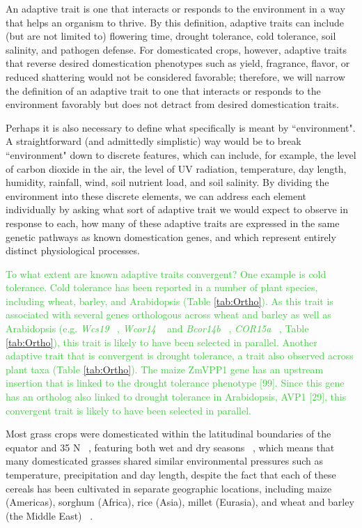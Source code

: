 \documentclass[12pt]{article}
\newcommand{\mw}[1]{\textcolor{LimeGreen}{\normalsize #1}}
\begin{document}
An adaptive trait is one that interacts or responds to the environment in a way that helps an organism to thrive. 
By this definition, adaptive traits can include (but are not limited to) flowering time, drought tolerance, cold tolerance, soil salinity, and pathogen defense. 
For domesticated crops, however, adaptive traits that reverse desired domestication phenotypes such as yield, fragrance, flavor, or reduced shattering would not be considered favorable; therefore, we will narrow the definition of an adaptive trait to one that interacts or responds to the environment favorably but does not detract from desired domestication traits. 

Perhaps it is also necessary to define what specifically is meant by ``environment".
A straightforward (and admittedly simplistic) way would be to break ``environment" down to discrete features, which can include, for example, the level of carbon dioxide in the air, the level of UV radiation, temperature, day length, humidity, rainfall, wind, soil nutrient load, and soil salinity. 
By dividing the environment into these discrete elements, we can address each element individually by asking what sort of adaptive trait we would expect to observe in response to each, how many of these adaptive traits are expressed in the same genetic pathways as known domestication genes, and which represent entirely distinct physiological processes.

\mw{To what extent are known adaptive traits convergent? One example is cold tolerance. Cold tolerance has been reported in a number of plant species, including wheat, barley, and Arabidopsis (Table \ref{tab:Ortho}). As this trait is associated with several genes orthologous across wheat and barley as well as Arabidopsis (e.g.  \textit{Wcs19} ~\citep{pmid8219063}, \textit{Wcor14} ~\citep{pmid10846621} and \textit{Bcor14b} ~\citep{pmid9952464}, \textit{COR15a}  ~\citep{pmid9826741, Takumi2003}, Table \ref{tab:Ortho}), this trait is likely to have been selected in parallel.  Another adaptive trait that is convergent is drought tolerance, a trait also observed across plant taxa (Table \ref{tab:Ortho}). The maize ZmVPP1 gene has an upstream insertion that is linked to the drought tolerance phenotype [99]. Since this gene has an ortholog also linked to drought tolerance in Arabidopsis, AVP1 [29], this convergent trait is likely to have been selected in parallel. }

Most grass crops were domesticated within the latitudinal boundaries of the equator and 35 N ~\citep{Jain1993, Gepts2010}, featuring both wet and dry seasons ~\citep{Jain1993}, which means that many domesticated grasses shared similar environmental pressures such as temperature, precipitation and day length, despite the fact that each of these cereals has been cultivated in separate geographic locations, including maize (Americas), sorghum (Africa), rice (Asia), millet (Eurasia), and wheat and barley (the Middle East) ~\citep{Glmin2009}.
\end{document}
